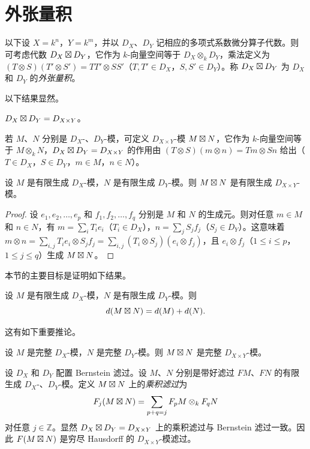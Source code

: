 \section{外张量积}

以下设 $X=k^n$，$Y=k^m$，并以 $D_X$、$D_Y$ 记相应的多项式系数微分算子代数。则可考虑代数 $D_X\mathbin{\boxtimes} D_Y$，它作为 $k$-向量空间等于 $D_X\otimes_k D_Y$，乘法定义为 $(T\otimes S)(T'\otimes S')=TT'\otimes SS'$（$T,T'\in D_X$，$S,S'\in D_Y$）。称 $D_X\mathbin{\boxtimes} D_Y$ 为 $D_X$ 和 $D_Y$ 的\emph{外张量积}。

以下结果显然。

\begin{lemma}
$D_X\mathbin{\boxtimes} D_Y=D_{X\times Y}$。
\end{lemma}

若 $M$、$N$ 分别是 $D_X$-、$D_Y$-模，可定义 $D_{X\times Y}$-模 $M\mathbin{\boxtimes} N$，它作为 $k$-向量空间等于 $M\otimes_k N$，$D_X\mathbin{\boxtimes} D_Y=D_{X\times Y}$ 的作用由 $(T\otimes S)(m\otimes n)=Tm\otimes Sn$ 给出（$T\in D_X$，$S\in D_Y$，$m\in M$，$n\in N$）。

\begin{lemma}
设 $M$ 是有限生成 $D_X$-模，$N$ 是有限生成 $D_Y$-模。则 $M\mathbin{\boxtimes} N$ 是有限生成 $D_{X\times Y}$-模。
\end{lemma}

\begin{proof}
设 $e_1,e_2,\dots,e_p$ 和 $f_1,f_2,\dots,f_q$ 分别是 $M$ 和 $N$ 的生成元。则对任意 $m\in M$ 和 $n\in N$，有 $m=\sum_i T_ie_i$（$T_i\in D_X$），$n=\sum_j S_jf_j$（$S_j\in D_Y$）。这意味着 $m\otimes n=\sum_{i,j}T_ie_i\otimes S_jf_j=\sum_{i,j}(T_i\otimes S_j)(e_i\otimes f_j)$，且 $e_i\otimes f_j$（$1\le i\le p$，$1\le j\le q$）生成 $M\mathbin{\boxtimes} N$。
\end{proof}

本节的主要目标是证明如下结果。

\begin{theorem}
设 $M$ 是有限生成 $D_X$-模，$N$ 是有限生成 $D_Y$-模。则
$$d(M\mathbin{\boxtimes} N)=d(M)+d(N).$$
\end{theorem}

这有如下重要推论。

\begin{corollary}
设 $M$ 是完整 $D_X$-模，$N$ 是完整 $D_Y$-模。则 $M\mathbin{\boxtimes} N$ 是完整 $D_{X\times Y}$-模。
\end{corollary}

设 $D_X$ 和 $D_Y$ 配置 Bernstein 滤过。设 $M$、$N$ 分别是带好滤过 $F M$、$F N$ 的有限生成 $D_X$-、$D_Y$-模。定义 $M\mathbin{\boxtimes} N$ 上的\emph{乘积滤过}为
$$F_j(M\mathbin{\boxtimes} N)=\sum_{p+q=j}F_pM\otimes_k F_qN$$
对任意 $j\in\mathbb{Z}$。显然 $D_X\mathbin{\boxtimes} D_Y=D_{X\times Y}$ 上的乘积滤过与 Bernstein 滤过一致。因此 $F(M\mathbin{\boxtimes} N)$ 是穷尽 Hausdorff 的 $D_{X\times Y}$-模滤过。


